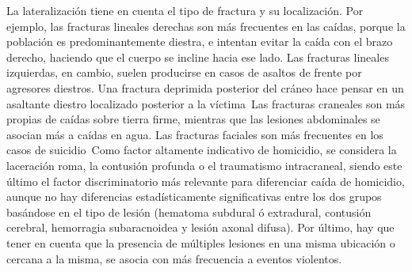 La lateralización tiene en cuenta el tipo de fractura y su localización. Por ejemplo, las fracturas lineales derechas son más frecuentes en las caídas, porque la población es predominantemente diestra, e intentan evitar la caída con el brazo derecho, haciendo que el cuerpo se incline hacia ese lado. Las fracturas lineales izquierdas, en cambio, suelen producirse en casos de asaltos de frente por agresores diestros. Una fractura deprimida posterior del cráneo hace pensar en un asaltante diestro localizado posterior a la víctima\
Las fracturas craneales son más propias de caídas sobre tierra firme, mientras que las lesiones abdominales se asocian más a caídas en agua. Las fracturas faciales son más frecuentes en los casos de suicidio\
Como factor altamente indicativo de homicidio, se considera la laceración roma, la contusión profunda o el traumatismo intracraneal, siendo este último el factor discriminatorio más relevante para diferenciar caída de homicidio, aunque no hay diferencias estadísticamente significativas entre los dos grupos basándose en el tipo de lesión (hematoma subdural ó extradural, contusión cerebral, hemorragia subaracnoidea y lesión axonal difusa). Por último, hay que tener en cuenta que la presencia de múltiples lesiones en una misma ubicación o cercana a la misma, se asocia con más frecuencia a eventos violentos.\

